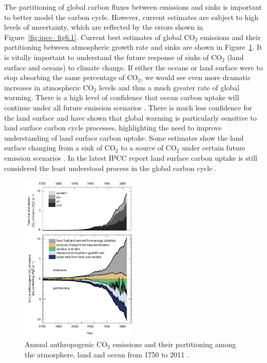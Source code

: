 \documentclass[12pt]{article}
\begin{document}
The partitioning of global carbon fluxes between emissions and sinks is important to better model the carbon cycle. However, current estimates are subject to high levels of uncertainty, which are reflected by the errors shown in Figure~\ref{fig:ipcc_fig6.1}. Current best estimates of global CO\(_{2}\) emissions and their partitioning between atmospheric growth rate and sinks are shown in Figure~\ref{fig:ipcc_fig6.8}. It is vitally important to understand the future response of sinks of CO\(_{2}\) (land surface and oceans) to climate change. If either the oceans or land surface were to stop absorbing the same percentage of CO\(_{2}\), we would see even more dramatic increases in atmospheric CO\(_{2}\) levels and thus a much greater rate of global warming. There is a high level of confidence that ocean carbon uptake will continue under all future emission scenarios \citep{ciais2014carbon}. There is much less confidence for the land surface and \citet{1748-9326-7-2-024002} have shown that global warming is particularly sensitive to land surface carbon cycle processes, highlighting the need to improve understanding of land surface carbon uptake. Some estimates show the land surface changing from a sink of CO\(_{2}\) to a source of CO\(_{2}\) under certain future emission scenarios \citep{sitch2008evaluation, cox2000, scholze2006climate}. In the latest IPCC report land surface carbon uptake is still considered the least understood process in the global carbon cycle \citep{ciais2014carbon}.

\begin{figure}[ht]
    \centering
    \includegraphics[width=0.5\textwidth]{ipcc_fig6_8.jpg}
    \caption{Annual anthropogenic CO\(_{2}\) emissions and their partitioning among the atmosphere, land and ocean from 1750 to 2011  \citep{ciais2014carbon}.}
    \label{fig:ipcc_fig6.8}
\end{figure}
\end{document}
